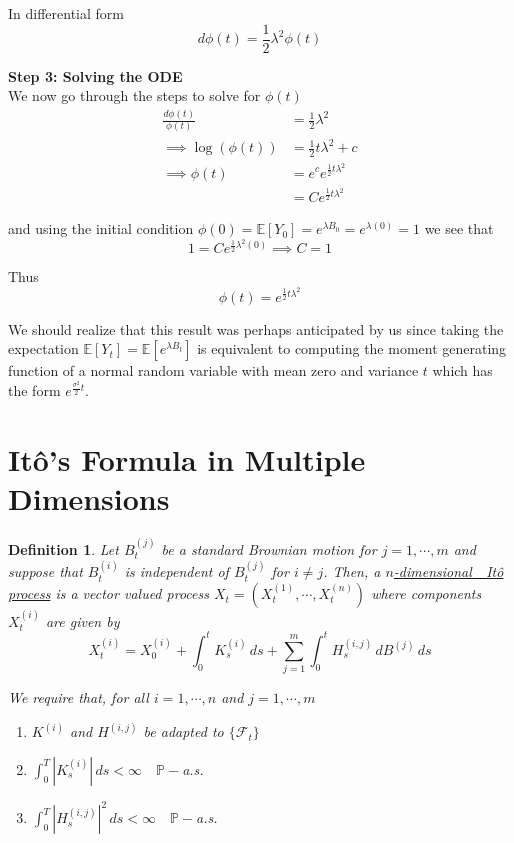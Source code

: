 \documentclass[12pt]{article}
\newtheorem{definition}{Definition}
\newlength\tindent
\renewcommand{\indent}{\hspace*{\tindent}}
\begin{document}
In differential form
\begin{equation*}
	d\phi(t) = \frac{1}{2}\lambda^2\phi(t)
\end{equation*}

{\bf Step 3: Solving the ODE} \\

We now go through the steps to solve for $\phi(t)$
\begin{align*}
	\frac{d\phi(t)}{\phi(t)} &= \frac{1}{2}\lambda^2 \\
	\implies \log(\phi(t)) &= \frac{1}{2}t\lambda^2 + c \\
	\implies \phi(t) &= e^{c}e^{\frac{1}{2}t\lambda^2} \\
	&= Ce^{\frac{1}{2}t\lambda^2}
\end{align*}

and using the initial condition $\phi(0) = \mathbb E[Y_0] = e^{\lambda B_0} = e^{\lambda(0)} = 1$ we see that
\begin{equation*}
	1 = Ce^{\frac{1}{2}\lambda^2(0)} \implies C = 1
\end{equation*}

Thus
\begin{equation*}
	\phi(t) = e^{\frac{1}{2}t\lambda^2}
\end{equation*}

\indent We should realize that this result was perhaps anticipated by us since taking the expectation $\mathbb E[Y_t] = \mathbb E[e^{\lambda B_t}]$ is equivalent to computing the moment generating function of a normal random variable with mean zero and variance $t$ which has the form $e^{\frac{\sigma^2}{2}t}$.

\section{It\^{o}'s Formula in Multiple Dimensions}

\begin{definition} Let $B^{(j)}_t$ be a standard Brownian motion for $j = 1, \cdots, m$ and suppose that $B^{(i)}_t$ is independent of $B^{(j)}_t$ for $i \neq j$. Then, a \underline{$n$-dimensional\footnotemark~~It\^{o} process} is a vector valued process $X_t = (X^{(1)}_t,\cdots,X^{(n)}_t)$ where components $X^{(i)}_t$ are given by
\begin{equation*}
	X^{(i)}_t = X^{(i)}_0 + \int^t_0 K^{(i)}_s\,ds + \sum^m_{j = 1}\int^t_0 H^{(i,j)}_s\,dB^{(j)}\,ds
\end{equation*}

We require that, for all $i = 1, \cdots, n$ and $j = 1, \cdots, m$
\begin{enumerate}
	\item $K^{(i)}$ and $H^{(i,j)}$ be adapted to $\{\mathcal F_t\}$
	\item $\int^T_0 |K^{(i)}_s|\,ds < \infty \quad \mathbb P-$a.s.
	\item $\int^T_0 |H^{(i,j)}_s|^2\,ds < \infty \quad \mathbb P-$a.s.
\end{enumerate}
\end{definition}
\end{document}
